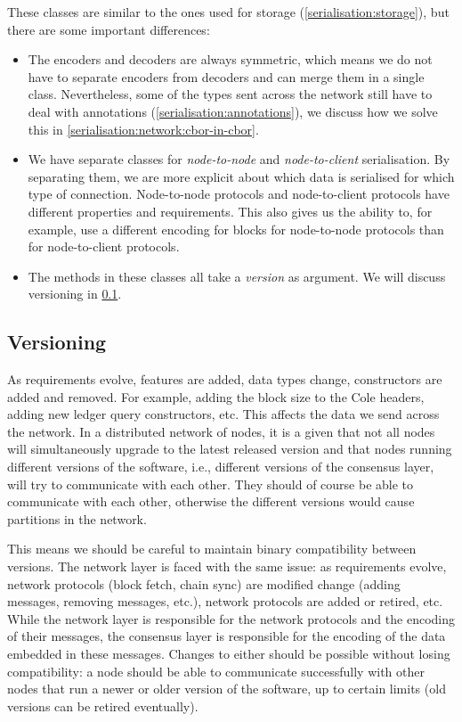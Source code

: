 These classes are similar to the ones used for storage
(\cref{serialisation:storage}), but there are some important differences:

\begin{itemize}
\item The encoders and decoders are always symmetric, which means we do not have
  to separate encoders from decoders and can merge them in a single class.
  Nevertheless, some of the types sent across the network still have to deal
  with annotations (\cref{serialisation:annotations}), we discuss how we solve
  this in \cref{serialisation:network:cbor-in-cbor}.
\item We have separate classes for \emph{node-to-node} and \emph{node-to-client}
  serialisation.
  By separating them, we are more explicit about which data is serialised for
  which type of connection. Node-to-node protocols and node-to-client protocols
  have different properties and requirements. This also gives us the ability to,
  for example, use a different encoding for blocks for node-to-node protocols
  than for node-to-client protocols.
\item The methods in these classes all take a \emph{version} as argument. We
  will discuss versioning in \cref{serialisation:network:versioning}.
\end{itemize}

\subsection{Versioning}
\label{serialisation:network:versioning}

As requirements evolve, features are added, data types change, constructors are
added and removed. For example, adding the block size to the Cole headers,
adding new ledger query constructors, etc. This affects the data we send across
the network. In a distributed network of nodes, it is a given that not all nodes
will simultaneously upgrade to the latest released version and that nodes
running different versions of the software, i.e., different versions of the
consensus layer, will try to communicate with each other. They should of course
be able to communicate with each other, otherwise the different versions would
cause partitions in the network.

This means we should be careful to maintain binary compatibility between
versions. The network layer is faced with the same issue: as requirements
evolve, network protocols (block fetch, chain sync) are modified
change (adding messages, removing messages, etc.), network protocols are added
or retired, etc. While the network layer is responsible for the network
protocols and the encoding of their messages, the consensus layer is responsible
for the encoding of the data embedded in these messages. Changes to either
should be possible without losing compatibility: a node should be able to
communicate successfully with other nodes that run a newer or older version of
the software, up to certain limits (old versions can be retired eventually).

